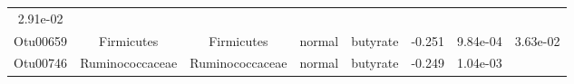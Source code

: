 \documentclass[11pt,]{article}
\begin{document}
\begin{longtable}[]{@{}cccccccc@{}}
\begin{minipage}[t]{0.08\columnwidth}
2.91e-02\strut
\end{minipage}\tabularnewline
\begin{minipage}[t]{0.08\columnwidth}\centering\strut
Otu00659\strut
\end{minipage} & \begin{minipage}[t]{0.15\columnwidth}\centering\strut
Firmicutes\strut
\end{minipage} & \begin{minipage}[t]{0.15\columnwidth}\centering\strut
Firmicutes\strut
\end{minipage} & \begin{minipage}[t]{0.08\columnwidth}\centering\strut
normal\strut
\end{minipage} & \begin{minipage}[t]{0.09\columnwidth}\centering\strut
butyrate\strut
\end{minipage} & \begin{minipage}[t]{0.07\columnwidth}\centering\strut
-0.251\strut
\end{minipage} & \begin{minipage}[t]{0.08\columnwidth}\centering\strut
9.84e-04\strut
\end{minipage} & \begin{minipage}[t]{0.08\columnwidth}\centering\strut
3.63e-02\strut
\end{minipage}\tabularnewline
\begin{minipage}[t]{0.08\columnwidth}\centering\strut
Otu00746\strut
\end{minipage} & \begin{minipage}[t]{0.15\columnwidth}\centering\strut
Ruminococcaceae\strut
\end{minipage} & \begin{minipage}[t]{0.15\columnwidth}\centering\strut
Ruminococcaceae\strut
\end{minipage} & \begin{minipage}[t]{0.08\columnwidth}\centering\strut
normal\strut
\end{minipage} & \begin{minipage}[t]{0.09\columnwidth}\centering\strut
butyrate\strut
\end{minipage} & \begin{minipage}[t]{0.07\columnwidth}\centering\strut
-0.249\strut
\end{minipage} & \begin{minipage}[t]{0.08\columnwidth}\centering\strut
1.04e-03\strut
\end{minipage} & \begin{minipage}[t]{0.08\columnwidth}\centering\strut

\end{minipage}
\end{longtable}
\end{document}
